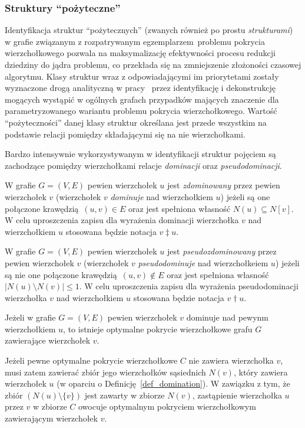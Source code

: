 \subsubsection{\textbf{Struktury ``pożyteczne''}}
\label{sss_ckx_structures}
\par{
  Identyfikacja struktur ``pożytecznych'' (zwanych również po prostu \emph{strukturami}) w grafie związanym z rozpatrywanym egzemplarzem problemu pokrycia wierzchołkowego pozwala na maksymalizację efektywności procesu redukcji dziedziny do jądra problemu, co przekłada się na zmniejszenie złożoności czasowej algorytmu. Klasy struktur wraz z odpowiadającymi im priorytetami zostały wyznaczone drogą analityczną w pracy~\cite{ImprovedBounds10} przez identyfikację i dekonstrukcję mogących wystąpić w ogólnych grafach przypadków mających znaczenie dla parametryzowanego wariantu problemu pokrycia wierzchołkowego.
  Wartość ``pożyteczności'' danej klasy struktur określana jest przede wszystkim na podstawie relacji pomiędzy składającymi się na nie wierzchołkami.
}
\par{
  Bardzo intensywnie wykorzystywanym w identyfikacji struktur pojęciem są zachodzące pomiędzy wierzchołkami relacje \emph{dominacji} oraz \emph{pseudodominacji}.
  \begin{definition}
    W grafie $G=(V, E)$ pewien wierzchołek $u$ jest \emph{zdominowany} przez pewien wierzchołek $v$ (wierzchołek $v$ \emph{dominuje} nad wierzchołkiem $u$) jeżeli są one połączone krawędzią $(u, v) \in E$ oraz jest spełniona własność $N(u) \subseteq N[v]$.
    W celu uproszczenia zapisu dla wyrażenia dominacji wierzchołka $v$ nad wierzchołkiem $u$ stosowana będzie notacja $v \ddagger u$.
  \end{definition}
  \begin{definition}
    W grafie $G=(V, E)$ pewien wierzchołek $u$ jest \emph{pseudozdominowany} przez pewien wierzchołek $v$ (wierzchołek $v$ \emph{pseudodominuje} nad wierzchołkeiem $u$) jeżeli są nie one połączone krawędzią $(u, v) \notin E$ oraz jest spełniona własność $|N(u) \setminus N(v)| \leq 1$.
    W celu uproszczenia zapisu dla wyrażenia pseudodominacji wierzchołka $v$ nad wierzchołkiem $u$ stosowana będzie notacja $v \dagger u$.
  \end{definition}
  \begin{theorem}
      Jeżeli w grafie $G=(V, E)$ pewien wierzchołek $v$ dominuje nad pewynm wierzchołkiem $u$, to istnieje optymalne pokrycie wierzchołkowe grafu $G$ zawierające wierzchołek $v$.
  \end{theorem}
  \begin{bproof}
    Jeżeli pewne optymalne pokrycie wierzchołkowe $C$ nie zawiera wierzchołka $v$, musi zatem zawierać zbiór jego wierzchołków sąsiednich $N(v)$, który zawiera wierzchołek $u$ (w oparciu o Definicję~\ref{def_domination}).
    W zawiązku z tym, że zbiór $(N(u) \setminus \{v\})$ jest zawarty w zbiorze $N(v)$, zastąpienie wierzchołka $u$ przez $v$ w zbiorze $C$ owocuje optymalnym pokryciem wierzchołkowym zawierającym wierzchołek $v$.
  \end{bproof}
}
